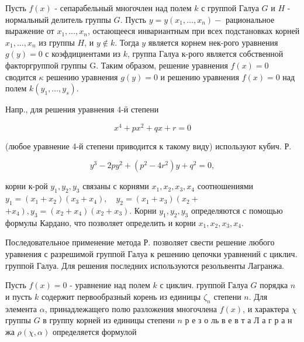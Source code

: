 \documentclass[10pt]{article}
\begin{document}
Пусть $f(x)$ - сепарабельный многочлен над полем $k$ с группой Галуа $G$ и $H$ - нормальный делитель группы $G$. Пусть $y=y\left(x_{1}, \ldots, x_{n}\right)-$ рациональное выражение от $x_{1}, \ldots, x_{n}$, остающееся инвариантным при всех подстановках корней $x_{1}, \ldots, x_{n}$ из группы $H$, и $y \notin k$. Тогда $y$ является корнем нек-рого уравнения $g(y)=0$ с коэфдициентами из $k$, группа Галуа к-рого является собственной факторгруппой группы G. Таким образом, решение уравнения $f(x)=0$ сводится $\kappa$ решению уравнения $g(y)=0$ и решению уравнения $f(x)=0$ над полем $k\left(y_{1}, \ldots, y_{s}\right)$.



Напр., для решения уравнения 4-ӥ степени



\[

x^{4}+p x^{2}+q x+r=0

\]



(любое уравнение 4-й степени приводится к такому виду) используют кубич. Р.



\[

y^{3}-2 p y^{2}+\left(p^{2}-4 r^{2}\right) y+q^{2}=0,

\]



корни к-рой $y_{1}, y_{2}, y_{3}$ связаны с корнями $x_{1}, x_{2}, x_{3}, x_{4}$ соотношениями $y_{1}=\left(x_{1}+x_{2}\right)\left(x_{3}+x_{4}\right), \quad y_{2}=\left(x_{1}+x_{3}\right)\left(x_{2}+\right.$ $\left.+x_{4}\right), y_{3}=\left(x_{2}+x_{4}\right)\left(x_{2}+x_{3}\right)$. Корни $y_{1}, y_{2}, y_{3}$ определяются с помощью формулы Кардано, что позволяет определить и корни $x_{1}, x_{2}, x_{3}, x_{4}$.



Последовательное применение метода Р. позволяет свести решение любого уравнения с разрешимой группой Галуа к решению цепочки уравнений с циклич. группой Галуа. Для решения последних используются резольвенты Лагранжа.



Пусть $f(x)=0$ - уравнение над полем $k$ с циклич. группой Галуа $G$ порядка $n$ и пусть $k$ содержит первообразный корень из единицы $\zeta_{n}$ степени $n$. Для элемента $\alpha$, принадлежащего полю разложения многочлена $f(x)$, и характера $\chi$ группы $G$ в группу корней из единицы степени $n$ р е з о ль в е в т а Л а г р а н жа $\rho(\chi, \alpha)$ определяется формулой
\end{document}
